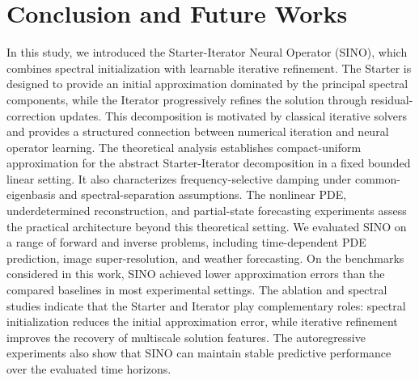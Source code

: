 \documentclass[preprint,numbers,sort&compress]{elsarticle}
\begin{document}
			\section{Conclusion and Future Works} \label{sec4}
			In this study, we introduced the Starter-Iterator Neural Operator (SINO),  which combines spectral initialization with learnable iterative refinement.  The Starter is designed to provide an initial approximation dominated by the principal spectral components, while the Iterator progressively refines the  solution through residual-correction updates. This decomposition is motivated  by classical iterative solvers and provides a structured connection between numerical iteration and neural operator learning. The theoretical analysis establishes compact-uniform approximation for the abstract Starter-Iterator
			decomposition in a fixed bounded linear setting.
			It also characterizes frequency-selective damping under
			common-eigenbasis and spectral-separation assumptions.
			The nonlinear PDE, underdetermined reconstruction, and
			partial-state forecasting experiments assess the practical
			architecture beyond this theoretical setting. We evaluated SINO on a range of forward and inverse problems, including time-dependent PDE prediction, image super-resolution, and weather forecasting. On the benchmarks considered in this work, SINO achieved lower approximation errors than the compared baselines in most experimental settings. The ablation and spectral studies indicate that the Starter and Iterator play complementary roles: spectral initialization reduces the initial approximation error, while iterative refinement improves the recovery of multiscale solution features. The autoregressive experiments also show that SINO can maintain stable predictive performance over the evaluated time horizons. 
			
			
\end{document}

